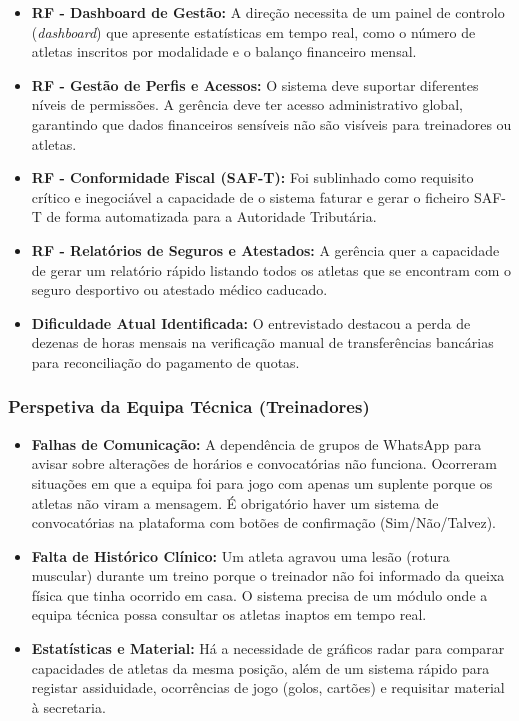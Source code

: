 \documentclass[a4paper,12pt]{scrreprt}
\begin{document}
{\begin{itemize}
    \item \textbf{RF - Dashboard de Gestão:} A direção necessita de um painel de controlo (\textit{dashboard}) que apresente estatísticas em tempo real, como o número de atletas inscritos por modalidade e o balanço financeiro mensal.
    \item \textbf{RF - Gestão de Perfis e Acessos:} O sistema deve suportar diferentes níveis de permissões. A gerência deve ter acesso administrativo global, garantindo que dados financeiros sensíveis não são visíveis para treinadores ou atletas.
    \item \textbf{RF - Conformidade Fiscal (SAF-T):} Foi sublinhado como requisito crítico e inegociável a capacidade de o sistema faturar e gerar o ficheiro SAF-T de forma automatizada para a Autoridade Tributária.
    \item \textbf{RF - Relatórios de Seguros e Atestados:} A gerência quer a capacidade de gerar um relatório rápido listando todos os atletas que se encontram com o seguro desportivo ou atestado médico caducado.
    \item \textbf{Dificuldade Atual Identificada:} O entrevistado destacou a perda de dezenas de horas mensais na verificação manual de transferências bancárias para reconciliação do pagamento de quotas.
\end{itemize}

\subsubsection*{Perspetiva da Equipa Técnica (Treinadores)}
\begin{itemize}
    \item \textbf{Falhas de Comunicação:} A dependência de grupos de WhatsApp para avisar sobre alterações de horários e convocatórias não funciona. Ocorreram situações em que a equipa foi para jogo com apenas um suplente porque os atletas não viram a mensagem. É obrigatório haver um sistema de convocatórias na plataforma com botões de confirmação (Sim/Não/Talvez).
    \item \textbf{Falta de Histórico Clínico:} Um atleta agravou uma lesão (rotura muscular) durante um treino porque o treinador não foi informado da queixa física que tinha ocorrido em casa. O sistema precisa de um módulo onde a equipa técnica possa consultar os atletas inaptos em tempo real.
    \item \textbf{Estatísticas e Material:} Há a necessidade de gráficos radar para comparar capacidades de atletas da mesma posição, além de um sistema rápido para registar assiduidade, ocorrências de jogo (golos, cartões) e requisitar material à secretaria.
\end{itemize}

}
\end{document}
